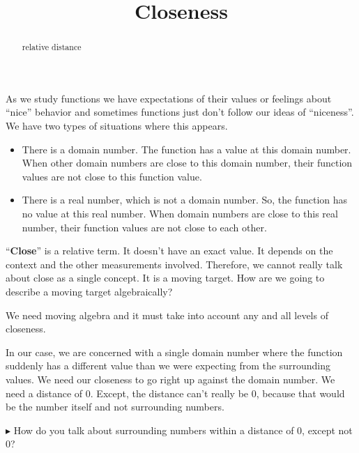\documentclass{ximera}
\title{Closeness}
\begin{document}
\begin{abstract}
relative distance
\end{abstract}
\maketitle







As we study functions we have expectations of their values or feelings about ``nice'' behavior and sometimes functions just don't follow our ideas of ``niceness''.  We have two types of situations where this appears.

\begin{itemize}
\item There is a domain number. The function has a value at this domain number. When other domain numbers are close to this domain number, their function values are not close to this function value.
\item There is a real number, which is not  a domain number. So, the function has no value at this real number. When  domain numbers are close to this real number, their function values are not close to each other.
\end{itemize}



``\textbf{\textcolor{purple!85!blue}{Close}}'' is a relative term.  It doesn't have an exact value.  It depends on the context and the other measurements involved.  Therefore, we cannot really talk about close as a single concept.  It is a moving target.  How are we going to describe a moving target algebraically?

We need moving algebra and it must take into account any and all levels of closeness.


In our case, we are concerned with a single domain number where the function suddenly has a different value than we were expecting from the surrounding values.  We need our closeness to go right up against the domain number. We need a distance of $0$.  Except, the distance can't really be $0$, because that would be the number itself and not surrounding numbers.

\textbf{\textcolor{red!70!darkgray}{$\blacktriangleright$}}  How do you talk about surrounding numbers within a distance of $0$, except not $0$?
\end{document}
